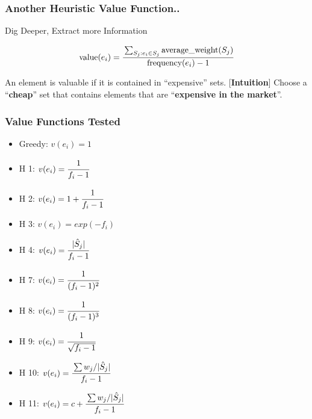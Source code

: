 \documentclass[xcolor=dvipsnames]{beamer}
\newlength\myheight
\newlength\mydepth
\newcommand*\inlinegraphics[1]{%
  \settototalheight\myheight{Xygp}%
  \settodepth\mydepth{Xygp}%
  \raisebox{-\mydepth}{\texttt{[image: \#1]}}%
}
\begin{document}
\begin{frame}
\frametitle{Another Heuristic Value Function..}
Dig Deeper, Extract more Information \inlinegraphics{excavators.eps}
\begin{minipage}{0.25\textwidth}
%
\end{minipage}%
\begin{minipage}{0.75\textwidth}
$$ \text{value}(e_i) = \cfrac{\sum_{S_j: e_i \in S_j} \text{average\_weight}(S_j)}{\text{frequency}(e_i)-1}$$
\end{minipage}
An element is valuable if it is contained in ``expensive'' sets.
[\textbf{Intuition}] Choose a ``\textbf{cheap}'' set that contains elements that are ``\textbf{expensive in the market}''.
\end{frame}

\begin{frame}
\frametitle{Value Functions Tested}
\begin{minipage}{0.50\textwidth}
\begin{itemize}
\item Greedy: $v(e_i) = 1$
\item H 1: $v(e_i) = \cfrac{1}{f_i -1}$
\item H 2: $v(e_i) = 1+\cfrac{1}{f_i -1}$
\item H 3: $v(e_i) = exp(-f_i)$
\item H 4: $v(e_i) = \cfrac{|\hat{S}_j|}{f_i -1}$
\item H 7: $v(e_i) = \cfrac{1}{(f_i -1)^2}$

\end{itemize}
\end{minipage}%
\begin{minipage}{0.50\textwidth}
\begin{itemize}
\item H 8: $v(e_i) = \cfrac{1}{(f_i -1)^3}$
\item H 9: $v(e_i) = \cfrac{1}{\sqrt{f_i -1}}$
\item H 10: $v(e_i) = \cfrac{\sum w_j/|\hat{S}_j|}{f_i -1}$
\item H 11: $v(e_i) = c + \cfrac{\sum w_j/|\hat{S}_j|}{f_i -1}$
\end{itemize}
\end{minipage}
\end{frame}
\end{document}
